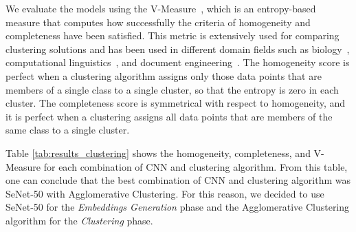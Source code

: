 We evaluate the models using the V-Measure~\cite{vmeasure}, which is an entropy-based measure that computes how successfully the criteria of homogeneity and completeness have been satisfied. This metric is extensively used for comparing clustering solutions and has been used in different domain fields such as biology~\cite{bio1}, computational linguistics~\cite{nlp1}, and document engineering~\cite{doceng}.
The homogeneity score is perfect when a clustering algorithm assigns only those data points that are members of a single class to a single cluster, so that the entropy is zero in each cluster. The completeness score is symmetrical with respect to homogeneity, and it is perfect when a clustering assigns all data points that are members of the same class to a single cluster.

Table \ref{tab:results_clustering} shows the homogeneity, completeness, and V-Measure for each combination of CNN and clustering algorithm.
From this table, one can conclude that the best combination of CNN and clustering algorithm was SeNet-50 with Agglomerative Clustering.
For this reason, we decided to use SeNet-50 for the \emph{Embeddings Generation} phase and the Agglomerative Clustering algorithm for the \emph{Clustering} phase.



